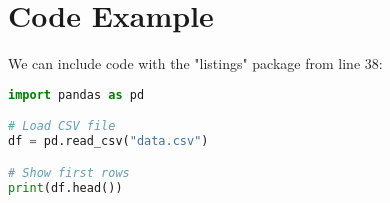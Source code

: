 \documentclass[12pt]{article}
\begin{document}
\section{Code Example}

We can include code with the "listings" package from line 38:

\begin{lstlisting}[language=Python, caption=Example Python code]
import pandas as pd

# Load CSV file
df = pd.read_csv("data.csv")

# Show first rows
print(df.head())
\end{lstlisting}



\end{document}
